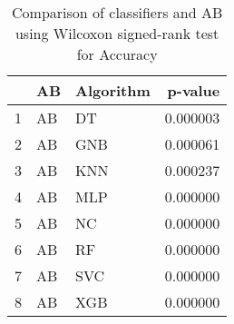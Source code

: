 \begin{table}
\footnotesize
\caption{Comparison of classifiers and AB using Wilcoxon signed-rank test for Accuracy}
\label{tab:AB wilcoxon Accuracy comparison}
\begin{tabular}{lllr}
\hline
 & AB & Algorithm & p-value \\
\hline
1 & AB & DT & 0.000003 \\
2 & AB & GNB & 0.000061 \\
3 & AB & KNN & 0.000237 \\
4 & AB & MLP & 0.000000 \\
5 & AB & NC & 0.000000 \\
6 & AB & RF & 0.000000 \\
7 & AB & SVC & 0.000000 \\
8 & AB & XGB & 0.000000 \\
\hline
\end{tabular}
\end{table}
